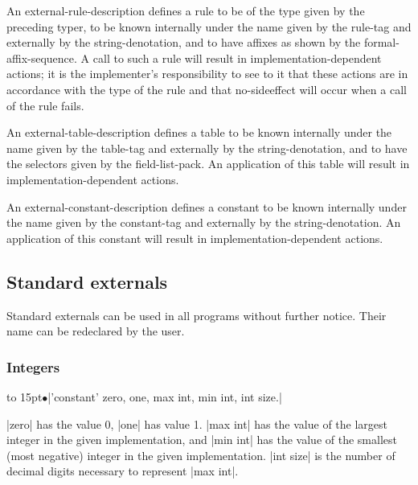 \documentclass{article}
\newcommand\A{{\sf ALEPH}}
\newcommand\g[1]{{\sf #1}}
\begin{document}
An \g{external-rule-description} defines a rule to be of the type given by
the preceding \g{typer}, to be known internally under the name given by the
\g{rule-tag} and externally by the \g{string-denotation}, and to have affixes as
shown by the \g{formal-affix-sequence}. A call to such a rule will result in
implementation-dependent actions; it is the implementer's responsibility to
see to it that these actions are in accordance with the type of the rule and
that no-sideeffect will occur when a call of the rule fails.

An \g{external-table-description} defines a table to be known internally
under the name given by the \g{table-tag} and externally by the
 \g{string-denotation}, and to have the selectors given by the
\g{field-list-pack}. An
application of this table will result in implementation-dependent actions.

An \g{external-constant-description} defines a constant to be known
internally under the name given by the \g{constant-tag} and externally by the
\g{string-denotation}. An application of this constant will result in
implementation-dependent actions.

\subsection{Standard externals}\label{5.2}

Standard externals can be used in all programs without further notice. Their
name can be redeclared by the user.

\subsubsection{Integers}\label{5.2.1}


\newcommand\X{\smallskip\noindent\hbox to 15pt{\hss$\bullet$}\space}
\newcommand\Y{\par\hangindent=15pt\hangafter=0\noindent}


\X\pp|'constant' zero, one, max int, min int, int size.|\Y
\pp|zero| has the value 0, \pp|one| has value 1. \pp|max int| has the value
of the largest integer in the given implementation, and \pp|min int| has the
value of the smallest (most negative) integer in the given implementation.
\pp|int size| is the number of decimal digits necessary to represent
\pp|max int|.
\end{document}
